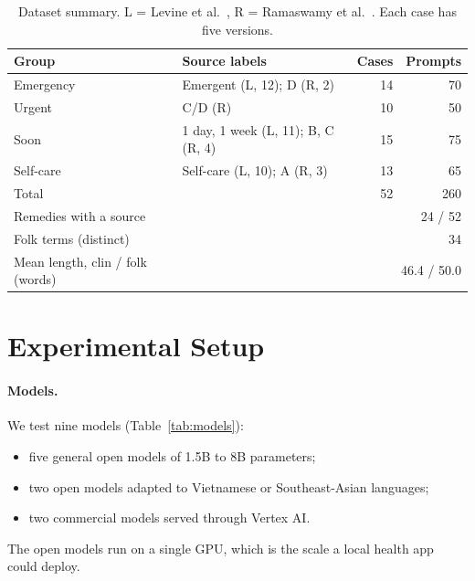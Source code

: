 \documentclass[runningheads]{llncs}
\begin{document}
\begin{table}[t]\centering\small
\caption{Dataset summary. L = Levine et al.~\cite{levine2024gpt3}, R = Ramaswamy et al.~\cite{ramaswamy2026chatgpthealth}. Each case has five versions.}\label{tab:data}
\begin{tabular}{llrr}\toprule
Group & Source labels & Cases & Prompts \\\midrule
Emergency & Emergent (L, 12); D (R, 2) & 14 & 70 \\
Urgent & C/D (R) & 10 & 50 \\
Soon & 1 day, 1 week (L, 11); B, C (R, 4) & 15 & 75 \\
Self-care & Self-care (L, 10); A (R, 3) & 13 & 65 \\\midrule
Total & & 52 & 260 \\
Remedies with a source & & \multicolumn{2}{r}{24 / 52} \\
Folk terms (distinct) & & \multicolumn{2}{r}{34} \\
Mean length, clin / folk (words) & & \multicolumn{2}{r}{46.4 / 50.0} \\\bottomrule
\end{tabular}
\end{table}

\section{Experimental Setup}

\paragraph{Models.} We test nine models (Table~\ref{tab:models}):
\begin{itemize}
\item five general open models of 1.5B to 8B parameters;
\item two open models adapted to Vietnamese or Southeast-Asian languages;
\item two commercial models served through Vertex AI.
\end{itemize}
The open models run on a single GPU, which is the scale a local health app could deploy.
\end{document}
